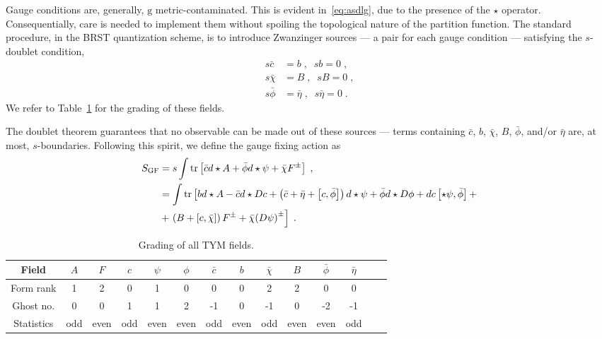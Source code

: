 \documentclass[../main/tex]{subfiles}
\begin{document}
Gauge conditions are, generally, $ \mathrm{g} $ metric-contaminated. This is evident in~\eqref{eq:asdlg}, due to the presence of the $\star$ operator. Consequentially, care is needed to implement them without spoiling the topological nature of the partition function. The standard procedure, in the BRST quantization scheme, is to introduce Zwanzinger sources --- a pair for each gauge condition --- satisfying the $s$-doublet condition,
\begin{subequations}\label{eq:anti-ghost_lautrup-nakanishi}
  \begin{align}
    s \bar{ c }  & = b \;, \;\; s b  = 0 \;,                    \\
    s \bar{\chi} & = B \;, \;\; s B        = 0 \;,              \\
    s \bar{\phi} & = \bar{\eta} \;, \;\; s \bar{ \eta } = 0 \;.
  \end{align}
\end{subequations}
We refer to Table~\ref{tab:tym-grading} for the grading of these fields.

The doublet theorem guarantees that no observable can be made out of these sources --- terms containing $\bar{c}$, $b$, $\bar{\chi}$, $B$, $\bar{\phi}$, and/or $\bar{\eta}$ are, at most, $s$-boundaries. Following this spirit, we define the gauge fixing action as
\begin{subequations}\label{eq:tym-gf-action}
  \begin{align}
    S_{\text{GF}} & = s \int \operatorname{tr} \left[ \bar{c} d \star A + \bar{\phi} d \star \psi + \bar{\chi} F^{\pm} \right] \;,                                                                                                                                 \\
                  & =  \int \operatorname{tr} \left[ b d \star A - \bar{c} d \star Dc + \left( \bar{c} + \bar{\eta} + \left[ c,\bar{\phi} \right] \right) d \star \psi + \bar{\phi} d \star D \phi + d c \left[ \star \psi ,\bar{\phi} \right] + \right. \nonumber \\
                  & + \left. \left( B + \left[ c,\bar{\chi} \right] \right) F^{\pm} + \bar{\chi} {\left( D \psi \right)}^{ \pm } \right] \;.
  \end{align}
\end{subequations}

\begin{table}[htpb]
  \caption{Grading of all TYM fields.}
  \label{tab:tym-grading}
  \begin{tabular}{cccccccccccccc}
    \toprule
    Field      & $A$ & $F$  & $c$ & $\psi$ & $\phi$ & $\bar{c}$ & $b$  & $\bar{\chi}$ & $B$  & $\bar{\phi}$ & $\bar{\eta}$ \\
    \midrule
    Form rank  & 1   & 2    & 0   & 1      & 0      & 0         & 0    & 2            & 2    & 0            & 0            \\
    Ghost no.  & 0   & 0    & 1   & 1      & 2      & -1        & 0    & -1           & 0    & -2           & -1           \\
    Statistics & odd & even & odd & even   & even   & odd       & even & odd          & even & even         & odd          \\
    \bottomrule
  \end{tabular}
\end{table}
\end{document}
